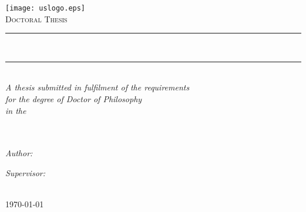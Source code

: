 \pagestyle{empty}
	\begin{center}

		\texttt{[image: uslogo.eps]} \\ \medskip
		\vspace*{.05\textheight}
		\textsc{\Large Doctoral Thesis}\\%

		\rule{.9\linewidth}{.6pt}\\[0.4cm]
		{\huge \myTitle \par}\vspace{0.4cm} %
		\rule{.9\linewidth}{.6pt}\\[1cm] 

		\large \textit{A thesis submitted in fulfilment of the requirements\\ for the degree of Doctor of Philosophy}\\[0.5cm] %
		\textit{in the}\\[0.5cm]
		\myDepartment\\ \myFaculty\\[1cm]
	
		\begin{minipage}{.45\linewidth}
			\begin{flushleft} %
			\emph{Author:}\\
			\href{https://uk.linkedin.com/in/fabriziomiano}{\myName} %
			\end{flushleft}
		\end{minipage}
		\hfill
		\begin{minipage}{.45\linewidth}
			\begin{flushright} %
			\emph{Supervisor:} \\
			\mySupervisor %
			\end{flushright}
		\end{minipage}\\ [0.5cm]

		{\large \today}\\%
		 
		\vfill
	\end{center}
